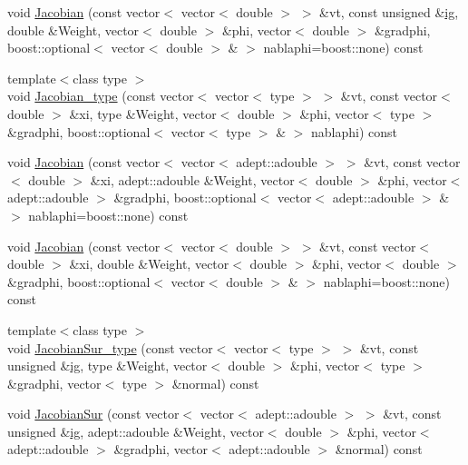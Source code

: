 \begin{DoxyCompactItemize}
\item 
void \mbox{\hyperlink{classfemus_1_1elem__type__2_d_afa07b600dc9f53257ca5fde905dc6732}{Jacobian}} (const vector$<$ vector$<$ double $>$ $>$ \&vt, const unsigned \&\mbox{\hyperlink{namespacefemus_a6df31099f676311de214a312d7043941}{ig}}, double \&Weight, vector$<$ double $>$ \&phi, vector$<$ double $>$ \&gradphi, boost\+::optional$<$ vector$<$ double $>$ \& $>$ nablaphi=boost\+::none) const
\item 
{\footnotesize template$<$class type $>$ }\\void \mbox{\hyperlink{classfemus_1_1elem__type__2_d_aa05f28f91f1eb9e2c45bd01c3c44443f}{Jacobian\+\_\+type}} (const vector$<$ vector$<$ type $>$ $>$ \&vt, const vector$<$ double $>$ \&xi, type \&Weight, vector$<$ double $>$ \&phi, vector$<$ type $>$ \&gradphi, boost\+::optional$<$ vector$<$ type $>$ \& $>$ nablaphi) const
\item 
void \mbox{\hyperlink{classfemus_1_1elem__type__2_d_ab63098a94dbccfc4808881b61fc9ab81}{Jacobian}} (const vector$<$ vector$<$ adept\+::adouble $>$ $>$ \&vt, const vector$<$ double $>$ \&xi, adept\+::adouble \&Weight, vector$<$ double $>$ \&phi, vector$<$ adept\+::adouble $>$ \&gradphi, boost\+::optional$<$ vector$<$ adept\+::adouble $>$ \& $>$ nablaphi=boost\+::none) const
\item 
void \mbox{\hyperlink{classfemus_1_1elem__type__2_d_a0194ae2956bdb2aaf843e05477ac3684}{Jacobian}} (const vector$<$ vector$<$ double $>$ $>$ \&vt, const vector$<$ double $>$ \&xi, double \&Weight, vector$<$ double $>$ \&phi, vector$<$ double $>$ \&gradphi, boost\+::optional$<$ vector$<$ double $>$ \& $>$ nablaphi=boost\+::none) const
\item 
{\footnotesize template$<$class type $>$ }\\void \mbox{\hyperlink{classfemus_1_1elem__type__2_d_af324b839f42e9643b0297da480be49c1}{Jacobian\+Sur\+\_\+type}} (const vector$<$ vector$<$ type $>$ $>$ \&vt, const unsigned \&\mbox{\hyperlink{namespacefemus_a6df31099f676311de214a312d7043941}{ig}}, type \&Weight, vector$<$ double $>$ \&phi, vector$<$ type $>$ \&gradphi, vector$<$ type $>$ \&normal) const
\item 
void \mbox{\hyperlink{classfemus_1_1elem__type__2_d_af19f0963ef176d7a3b4180730ef028c9}{Jacobian\+Sur}} (const vector$<$ vector$<$ adept\+::adouble $>$ $>$ \&vt, const unsigned \&\mbox{\hyperlink{namespacefemus_a6df31099f676311de214a312d7043941}{ig}}, adept\+::adouble \&Weight, vector$<$ double $>$ \&phi, vector$<$ adept\+::adouble $>$ \&gradphi, vector$<$ adept\+::adouble $>$ \&normal) const

\end{DoxyCompactItemize}

